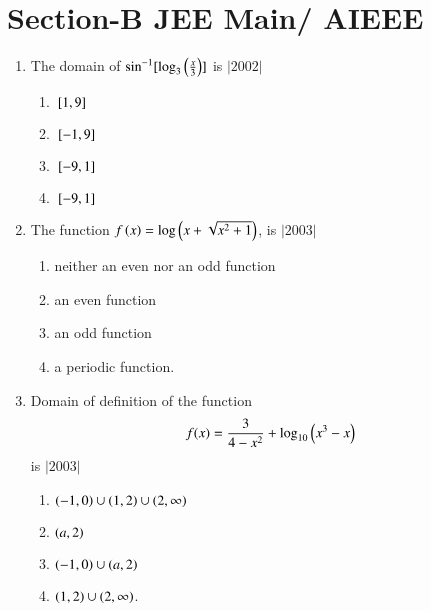\documentclass[journal,12pt,twocolumn,article]{IEEEtran}
\theoremstyle{remark}
\begin{document}
   \section*{Section-B JEE Main/ AIEEE}
	  \begin{enumerate}
		  \item The domain of $\sin^{-1}[\log_3\left(\frac{x}{3}\right)]$ is 
			  \hfill$|2002|$
			  \begin{enumerate}
				  \item ${}\left[1,9\right]$    
				  \item ${}\left[-1,9\right]$    
				  \item ${}\left[-9,1\right]$     
				  \item ${}\left[-9,1\right]$
			  \end{enumerate}
		  \item The function $f\left(x\right)=\log\left(x+\sqrt{x^2+1}\right)$, is 
			  \hfill$|2003|$
			  \begin{enumerate}
		  \item neither an even nor an odd function
		  \item an even function
		  \item an odd function
		  \item a periodic function.
			  \end{enumerate}
		  \item Domain of definition of the function 
			  \begin{align*}
				  f(x)=\frac{3}{4-x^2}+\log_{10}\left(x^3-x\right)
			  \end{align*}
			  is 
			  \hfill$|2003|$
			  \begin{enumerate}
				  \item $\left(-1,0\right)\cup\left(1,2\right)\cup\left(2,\infty\right)$     
				  \item $\left(a,2\right)$
				  \item $\left(-1,0\right)\cup\left(a,2\right)$                   
				  \item $\left(1,2\right)\cup\left(2,\infty\right)$.
			  \end{enumerate}
	  \end{enumerate}
\end{document}
